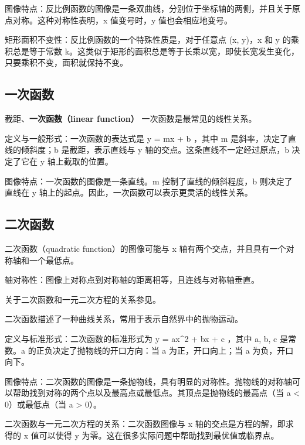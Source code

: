 图像特点：反比例函数的图像是一条双曲线，分别位于坐标轴的两侧，并且关于原点对称。这种对称性表明，x 值变号时，y 值也会相应地变号。

矩形面积不变性：反比例函数的一个特殊性质是，对于任意点 (x, y)，x 和 y 的乘积总是等于常数 k。这类似于矩形的面积总是等于长乘以宽，即使长宽发生变化，只要乘积不变，面积就保持不变。

\subsection{一次函数}

截距、\textbf{一次函数（linear function）}
一次函数是最常见的线性关系。

定义与一般形式：一次函数的表达式是  y = mx + b ，其中 m 是斜率，决定了直线的倾斜度；b 是截距，表示直线与 y 轴的交点。这条直线不一定经过原点，b 决定了它在 y 轴上截取的位置。

图像特点：一次函数的图像是一条直线。m 控制了直线的倾斜程度，b 则决定了直线在 y 轴上的起点。因此，一次函数可以表示更灵活的线性关系。

\subsection{二次函数}

二次函数（quadratic function）的图像可能与  x  轴有两个交点，并且具有一个对称轴和一个最低点。

轴对称性：图像上对称点到对称轴的距离相等，且连线与对称轴垂直。

关于二次函数和一元二次方程的关系参见。

二次函数描述了一种曲线关系，常用于表示自然界中的抛物运动。

定义与标准形式：二次函数的标准形式为  y = ax^2 + bx + c ，其中 a, b, c 是常数。a 的正负决定了抛物线的开口方向：当 a 为正，开口向上；当 a 为负，开口向下。

图像特点：二次函数的图像是一条抛物线，具有明显的对称性。抛物线的对称轴可以帮助找到对称的两个点以及最高点或最低点。其顶点是抛物线的最高点（当 a < 0）或最低点（当 a > 0）。

二次函数与一元二次方程的关系：二次函数图像与 x 轴的交点是方程的解，即求得的 x 值可以使得 y 为零。这在很多实际问题中帮助找到最优值或临界点。
